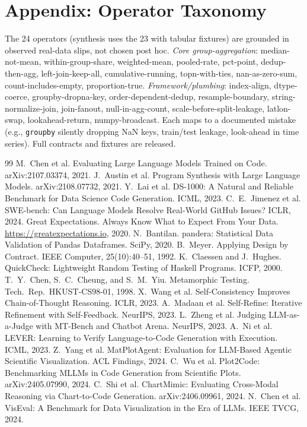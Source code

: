 \documentclass[10pt,twocolumn,letterpaper]{article}
\begin{document}
\section*{Appendix: Operator Taxonomy}
The 24 operators (synthesis uses the 23 with tabular fixtures) are grounded in
observed real-data slips, not chosen post hoc. \emph{Core group-aggregation}:
median-not-mean, within-group-share, weighted-mean, pooled-rate, pct-point,
dedup-then-agg, left-join-keep-all, cumulative-running, topn-with-ties,
nan-as-zero-sum, count-includes-empty, proportion-true. \emph{Framework/plumbing}:
index-align, dtype-coerce, groupby-dropna-key, order-dependent-dedup,
resample-boundary, string-normalize-join, join-fanout, null-in-agg-count,
scale-before-split-leakage, latlon-swap, lookahead-return, numpy-broadcast. Each
maps to a documented mistake (e.g., \texttt{groupby} silently dropping NaN keys,
train/test leakage, look-ahead in time series). Full contracts and fixtures are
released.

{\small
\begin{thebibliography}{99}
 M.~Chen et al. Evaluating Large Language Models Trained on Code. arXiv:2107.03374, 2021.
 J.~Austin et al. Program Synthesis with Large Language Models. arXiv:2108.07732, 2021.
 Y.~Lai et al. DS-1000: A Natural and Reliable Benchmark for Data Science Code Generation. ICML, 2023.
 C.~E.~Jimenez et al. SWE-bench: Can Language Models Resolve Real-World GitHub Issues? ICLR, 2024.
 Great Expectations. Always Know What to Expect From Your Data. \url{https://greatexpectations.io}, 2020.
 N.~Bantilan. pandera: Statistical Data Validation of Pandas Dataframes. SciPy, 2020.
 B.~Meyer. Applying Design by Contract. IEEE Computer, 25(10):40--51, 1992.
 K.~Claessen and J.~Hughes. QuickCheck: Lightweight Random Testing of Haskell Programs. ICFP, 2000.
 T.~Y.~Chen, S.~C.~Cheung, and S.~M.~Yiu. Metamorphic Testing. Tech.\ Rep.\ HKUST-CS98-01, 1998.
 X.~Wang et al. Self-Consistency Improves Chain-of-Thought Reasoning. ICLR, 2023.
 A.~Madaan et al. Self-Refine: Iterative Refinement with Self-Feedback. NeurIPS, 2023.
 L.~Zheng et al. Judging LLM-as-a-Judge with MT-Bench and Chatbot Arena. NeurIPS, 2023.
 A.~Ni et al. LEVER: Learning to Verify Language-to-Code Generation with Execution. ICML, 2023.
 Z.~Yang et al. MatPlotAgent: Evaluation for LLM-Based Agentic Scientific Visualization. ACL Findings, 2024.
 C.~Wu et al. Plot2Code: Benchmarking MLLMs in Code Generation from Scientific Plots. arXiv:2405.07990, 2024.
 C.~Shi et al. ChartMimic: Evaluating Cross-Modal Reasoning via Chart-to-Code Generation. arXiv:2406.09961, 2024.
 N.~Chen et al. VisEval: A Benchmark for Data Visualization in the Era of LLMs. IEEE TVCG, 2024.
\end{thebibliography}
}
\end{document}

